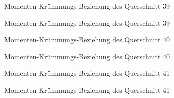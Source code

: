 \documentclass[
  11pt,
  letterpaper,
]{scrreprt}
\begin{document}
\begin{figure}[H]


\caption{\label{fig-qs_39}Momenten-Krümmungs-Beziehung des Querschnitt
39}

\end{figure}%

\begin{figure}[H]


\caption{\label{fig-m_chi_39}Momenten-Krümmungs-Beziehung des
Querschnitt 39}

\end{figure}%

\begin{figure}[H]


\caption{\label{fig-qs_40}Momenten-Krümmungs-Beziehung des Querschnitt
40}

\end{figure}%

\begin{figure}[H]


\caption{\label{fig-m_chi_40}Momenten-Krümmungs-Beziehung des
Querschnitt 40}

\end{figure}%

\begin{figure}[H]


\caption{\label{fig-qs_41}Momenten-Krümmungs-Beziehung des Querschnitt
41}

\end{figure}%

\begin{figure}[H]


\caption{\label{fig-m_chi_41}Momenten-Krümmungs-Beziehung des
Querschnitt 41}

\end{figure}%
\end{document}
